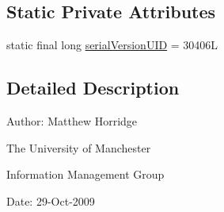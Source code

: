 \subsection*{Static Private Attributes}
\begin{DoxyCompactItemize}
\item 
static final long \hyperlink{classorg_1_1semanticweb_1_1owlapi_1_1reasoner_1_1_reasoner_interrupted_exception_a83f729152268077259ff3e87881ced80}{serial\-Version\-U\-I\-D} = 30406\-L
\end{DoxyCompactItemize}


\subsection{Detailed Description}
Author\-: Matthew Horridge\par
 The University of Manchester\par
 Information Management Group\par
 Date\-: 29-\/\-Oct-\/2009 

